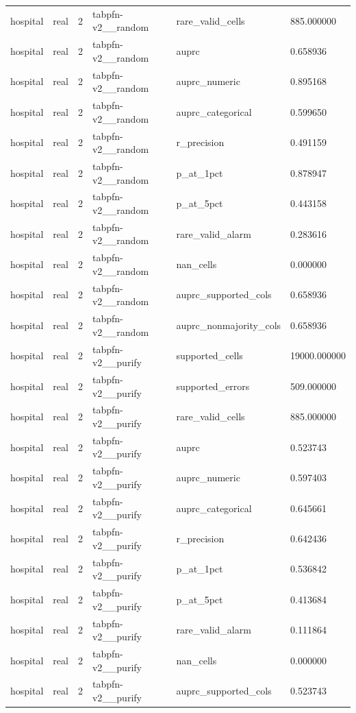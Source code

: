 \begin{tabular}{llllll}
hospital & real & 2 & tabpfn-v2\_\_random & rare\_valid\_cells & 885.000000 \\
hospital & real & 2 & tabpfn-v2\_\_random & auprc & 0.658936 \\
hospital & real & 2 & tabpfn-v2\_\_random & auprc\_numeric & 0.895168 \\
hospital & real & 2 & tabpfn-v2\_\_random & auprc\_categorical & 0.599650 \\
hospital & real & 2 & tabpfn-v2\_\_random & r\_precision & 0.491159 \\
hospital & real & 2 & tabpfn-v2\_\_random & p\_at\_1pct & 0.878947 \\
hospital & real & 2 & tabpfn-v2\_\_random & p\_at\_5pct & 0.443158 \\
hospital & real & 2 & tabpfn-v2\_\_random & rare\_valid\_alarm & 0.283616 \\
hospital & real & 2 & tabpfn-v2\_\_random & nan\_cells & 0.000000 \\
hospital & real & 2 & tabpfn-v2\_\_random & auprc\_supported\_cols & 0.658936 \\
hospital & real & 2 & tabpfn-v2\_\_random & auprc\_nonmajority\_cols & 0.658936 \\
hospital & real & 2 & tabpfn-v2\_\_purify & supported\_cells & 19000.000000 \\
hospital & real & 2 & tabpfn-v2\_\_purify & supported\_errors & 509.000000 \\
hospital & real & 2 & tabpfn-v2\_\_purify & rare\_valid\_cells & 885.000000 \\
hospital & real & 2 & tabpfn-v2\_\_purify & auprc & 0.523743 \\
hospital & real & 2 & tabpfn-v2\_\_purify & auprc\_numeric & 0.597403 \\
hospital & real & 2 & tabpfn-v2\_\_purify & auprc\_categorical & 0.645661 \\
hospital & real & 2 & tabpfn-v2\_\_purify & r\_precision & 0.642436 \\
hospital & real & 2 & tabpfn-v2\_\_purify & p\_at\_1pct & 0.536842 \\
hospital & real & 2 & tabpfn-v2\_\_purify & p\_at\_5pct & 0.413684 \\
hospital & real & 2 & tabpfn-v2\_\_purify & rare\_valid\_alarm & 0.111864 \\
hospital & real & 2 & tabpfn-v2\_\_purify & nan\_cells & 0.000000 \\
hospital & real & 2 & tabpfn-v2\_\_purify & auprc\_supported\_cols & 0.523743 \\

\end{tabular}
